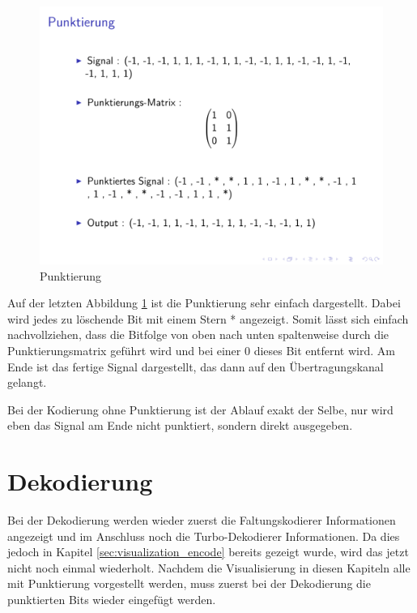 \begin{figure}[!ht]
\centering
\includegraphics[width=\ScaleIfNeeded]{pictures/TurboEncodePunctured5}
\caption{Punktierung}
\label{pic:TurboEncodePuncturing}
\end{figure}  

Auf der letzten Abbildung \ref{pic:TurboEncodePuncturing} ist die Punktierung sehr einfach dargestellt. Dabei wird jedes zu löschende Bit mit einem Stern * angezeigt. Somit lässt sich einfach nachvollziehen, dass die Bitfolge von oben nach unten spaltenweise durch die Punktierungsmatrix geführt wird und bei einer 0 dieses Bit entfernt wird. Am Ende ist das fertige Signal dargestellt, das dann auf den Übertragungskanal gelangt. 

Bei der Kodierung ohne Punktierung ist der Ablauf exakt der Selbe, nur wird eben das Signal am Ende nicht punktiert, sondern direkt ausgegeben.

\section{Dekodierung}
\label{sec:visualization_decode}
Bei der Dekodierung werden wieder zuerst die Faltungskodierer Informationen angezeigt und im Anschluss noch die Turbo-Dekodierer Informationen. Da dies jedoch in Kapitel \ref{sec:visualization_encode} bereits gezeigt wurde, wird das jetzt nicht noch einmal wiederholt. Nachdem die Visualisierung in diesen Kapiteln alle mit Punktierung vorgestellt werden, muss zuerst bei der Dekodierung die punktierten Bits wieder eingefügt werden.

